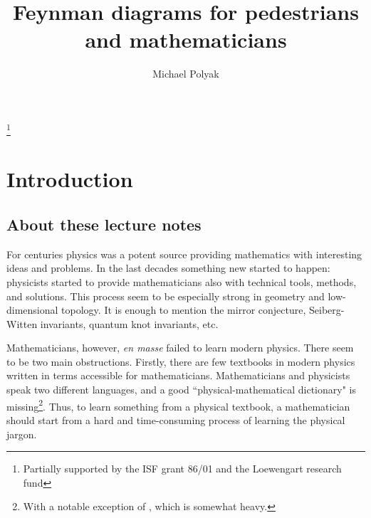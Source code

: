 \documentclass[10pt]{amsart}
\theoremstyle{definition}
\theoremstyle{remark}
\begin{document}
\title{{\bf Feynman diagrams for pedestrians and mathematicians}}
\author{Michael Polyak}
\address{Department of Mathematics, The Technion, 32000 Haifa, Israel}



\thanks{Partially supported by the ISF grant 86/01 and the
Loewengart research fund}




\maketitle


\section{Introduction}

\subsection{About these lecture notes}
For centuries physics was a potent source providing mathematics
with interesting ideas and problems. In the last decades something
new started to happen: physicists started to provide
mathematicians also with technical tools, methods, and solutions.
This process seem to be especially strong in geometry and
low-dimensional topology. It is enough to mention the mirror
conjecture, Seiberg-Witten invariants, quantum knot invariants,
etc.

Mathematicians, however, {\em en masse} failed to learn modern
physics. There seem to be two main obstructions. Firstly, there
are few textbooks in modern physics written in terms accessible
for mathematicians. Mathematicians and physicists speak two
different languages, and a good ``physical-mathematical dictionary"
is missing\footnote{With a notable exception of \cite{string},
which is somewhat heavy.}. Thus, to learn something from a
physical textbook, a mathematician should start from a hard and
time-consuming process of learning the physical jargon.
\end{document}
